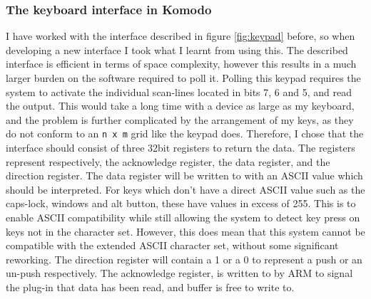 \subsubsection{The keyboard interface in Komodo}
I have worked with the interface described in figure \ref{fig:keypad} before, so when developing a new interface I took what I learnt from using this. The described interface is efficient in terms of space complexity, however this results in a much larger burden on the software required to poll it. Polling this keypad requires the system to activate the individual scan-lines located in bits 7, 6 and 5, and read the output. This would take a long time with a device as large as my keyboard, and the problem is further complicated by the arrangement of my keys, as they do not conform to an \verb|n x m| grid like the keypad does. Therefore, I chose that the interface should consist of three 32bit registers to return the data. The registers represent respectively, the acknowledge register, the data register, and the direction register. The data register will be written to with an ASCII value which should be interpreted. For keys which don't have a direct ASCII value such as the caps-lock, windows and alt button, these have values in excess of 255. This is to enable ASCII compatibility while still allowing the system to detect key press on keys not in the character set. However, this does mean that this system cannot be compatible with the extended ASCII character set, without some significant reworking. The direction register will contain a 1 or a 0 to represent a push or an un-push respectively. The acknowledge register, is written to by ARM to signal the plug-in that data has been read, and buffer is free to write to. 

